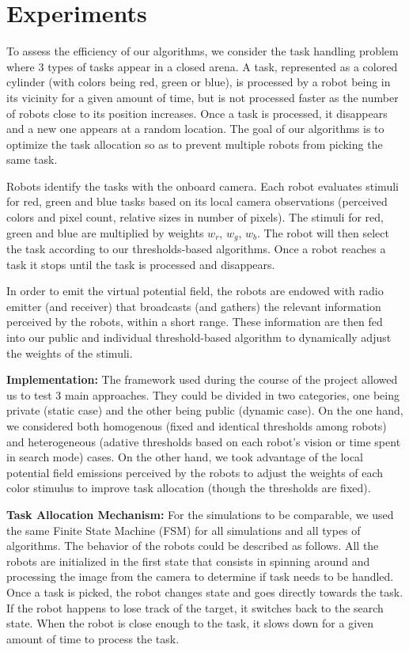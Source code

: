 \section{Experiments}
To assess the efficiency of our algorithms, we consider the task handling problem where 3 types of tasks appear in a closed arena. A task, represented as a colored cylinder (with colors being red, green or blue), is processed by a robot being in its vicinity for a given amount of time, but is not processed faster as the number of robots close to its position increases. Once a task is processed, it disappears and a new one appears at a random location. The goal of our algorithms is to optimize the task allocation so as to prevent multiple robots from picking the same task.

Robots identify the tasks with the onboard camera. Each robot evaluates stimuli for red, green and blue tasks based on its local camera observations (perceived colors and pixel count, relative sizes in number of pixels). The stimuli  for  red,  green  and blue  are  multiplied  by  weights $w_r$,  $w_g$,  $w_b$. The  robot  will  then select the  task according to our thresholds-based algorithms. Once a  robot reaches  a  task it stops until the task is processed and disappears.

In order to emit the virtual potential field, the robots are endowed with radio emitter (and receiver) that broadcasts (and gathers) the relevant information perceived by the robots, within a short range. These information are then fed into our public and individual threshold-based algorithm to dynamically adjust the weights of the stimuli.

\textbf{Implementation:}
The framework used during the course of the project allowed us to test 3 main approaches. They could be divided in two categories, one being private (static case) and the other being public (dynamic case). On the one hand, we considered both homogenous (fixed and identical thresholds among robots) and heterogeneous (adative thresholds based on each robot's vision or time spent in search mode) cases. On the other hand, we took advantage of the local potential field emissions perceived by the robots to adjust the weights of each color stimulus to improve task allocation (though the thresholds are fixed).

\textbf{Task Allocation Mechanism:}
For the simulations to be comparable, we used the same Finite State Machine (FSM) for all simulations and all types of algorithms. The behavior of the robots could be described as follows. All the robots are initialized in the first state that consists in spinning around and processing the image from the camera to determine if task needs to be handled. Once a task is picked, the robot changes state and goes directly towards the task. If the robot happens to lose track of the target, it switches back to the search state. When the robot is close enough to the task, it slows down for a given amount of time to process the task.

